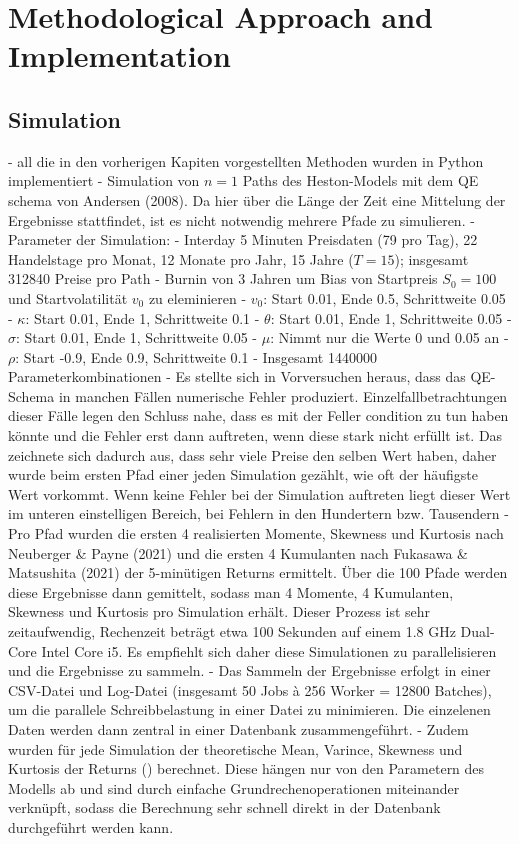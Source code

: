 \section{Methodological Approach and Implementation}
\label{sec:methodical_approach}

\subsection{Simulation}
- all die in den vorherigen Kapiten vorgestellten Methoden wurden in Python implementiert
- Simulation von $n=1$ Paths des Heston-Models mit dem QE schema von Andersen (2008). Da hier über die Länge der Zeit eine Mittelung der Ergebnisse stattfindet, ist es nicht notwendig mehrere Pfade zu simulieren.
- Parameter der Simulation:
    - Interday 5 Minuten Preisdaten (79 pro Tag), 22 Handelstage pro Monat, 12 Monate pro Jahr, 15 Jahre ($T = 15$); insgesamt 312840 Preise pro Path
    - Burnin von 3 Jahren um Bias von Startpreis $S_0 = 100$ und Startvolatilität $v_0$ zu eleminieren
    - $v_0$: Start 0.01, Ende 0.5, Schrittweite 0.05
    - $\kappa$: Start 0.01, Ende 1, Schrittweite 0.1
    - $\theta$: Start 0.01, Ende 1, Schrittweite 0.05
    - $\sigma$: Start 0.01, Ende 1, Schrittweite 0.05
    - $\mu$: Nimmt nur die Werte 0 und 0.05 an
    - $\rho$: Start -0.9, Ende 0.9, Schrittweite 0.1
    - Insgesamt 1440000 Parameterkombinationen
- Es stellte sich in Vorversuchen heraus, dass das QE-Schema in manchen Fällen numerische Fehler produziert. Einzelfallbetrachtungen dieser Fälle legen den Schluss nahe, dass es mit der Feller condition zu tun haben könnte und die Fehler erst dann auftreten, wenn diese stark nicht erfüllt ist. Das zeichnete sich dadurch aus, dass sehr viele Preise den selben Wert haben, daher wurde beim ersten Pfad einer jeden Simulation gezählt, wie oft der häufigste Wert vorkommt. Wenn keine Fehler bei der Simulation auftreten liegt dieser Wert im unteren einstelligen Bereich, bei Fehlern in den Hundertern bzw. Tausendern
- Pro Pfad wurden die ersten 4 realisierten Momente, Skewness und Kurtosis nach Neuberger & Payne (2021) und die ersten 4 Kumulanten nach Fukasawa & Matsushita (2021) der 5-minütigen Returns ermittelt. Über die 100 Pfade werden diese Ergebnisse dann gemittelt, sodass man 4 Momente, 4 Kumulanten, Skewness und Kurtosis pro Simulation erhält. Dieser Prozess ist sehr zeitaufwendig, Rechenzeit beträgt etwa 100 Sekunden auf einem 1.8 GHz Dual-Core Intel Core i5. Es empfiehlt sich daher diese Simulationen zu parallelisieren und die Ergebnisse zu sammeln.
- Das Sammeln der Ergebnisse erfolgt in einer CSV-Datei und Log-Datei (insgesamt 50 Jobs à 256 Worker = 12800 Batches), um die parallele Schreibbelastung in einer Datei zu minimieren. Die einzelenen Daten werden dann zentral in einer Datenbank zusammengeführt.
- Zudem wurden für jede Simulation der theoretische Mean, Varince, Skewness und Kurtosis der Returns (\cite{okhrinDistributionalPropertiesContinuous2023}) berechnet. Diese hängen nur von den Parametern des Modells ab und sind durch einfache Grundrechenoperationen miteinander verknüpft, sodass die Berechnung sehr schnell direkt in der Datenbank durchgeführt werden kann.

